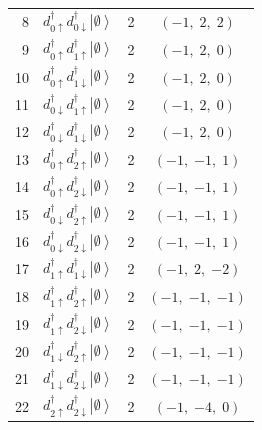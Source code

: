 \documentclass[11pt,a4paper]{article}
\newcommand{\ua}{\uparrow}
\newcommand{\da}{\downarrow}
\newcommand{\ket}[1]{\left|#1\right\rangle}
\newcommand{\empt}{\ket{\emptyset}}
\newcommand{\ddag}{d^{\dagger}}
\begin{document}
{\begin{longtable}{rp{8.6cm}cc}
 8 & $\ddag_{0\ua}\ddag_{0\da}\empt$
   & 2 & $(-1,\;2,\;2)$ \\
 9 & $\ddag_{0\ua}\ddag_{1\ua}\empt$
   & 2 & $(-1,\;2,\;0)$ \\
10 & $\ddag_{0\ua}\ddag_{1\da}\empt$
   & 2 & $(-1,\;2,\;0)$ \\
11 & $\ddag_{0\da}\ddag_{1\ua}\empt$
   & 2 & $(-1,\;2,\;0)$ \\
12 & $\ddag_{0\da}\ddag_{1\da}\empt$
   & 2 & $(-1,\;2,\;0)$ \\
13 & $\ddag_{0\ua}\ddag_{2\ua}\empt$
   & 2 & $(-1,\;{-1},\;1)$ \\
14 & $\ddag_{0\ua}\ddag_{2\da}\empt$
   & 2 & $(-1,\;{-1},\;1)$ \\
15 & $\ddag_{0\da}\ddag_{2\ua}\empt$
   & 2 & $(-1,\;{-1},\;1)$ \\
16 & $\ddag_{0\da}\ddag_{2\da}\empt$
   & 2 & $(-1,\;{-1},\;1)$ \\
17 & $\ddag_{1\ua}\ddag_{1\da}\empt$
   & 2 & $(-1,\;2,\;{-2})$ \\
18 & $\ddag_{1\ua}\ddag_{2\ua}\empt$
   & 2 & $(-1,\;{-1},\;{-1})$ \\
19 & $\ddag_{1\ua}\ddag_{2\da}\empt$
   & 2 & $(-1,\;{-1},\;{-1})$ \\
20 & $\ddag_{1\da}\ddag_{2\ua}\empt$
   & 2 & $(-1,\;{-1},\;{-1})$ \\
21 & $\ddag_{1\da}\ddag_{2\da}\empt$
   & 2 & $(-1,\;{-1},\;{-1})$ \\
22 & $\ddag_{2\ua}\ddag_{2\da}\empt$
   & 2 & $(-1,\;{-4},\;0)$ \\[3pt]
\midrule


\end{longtable}}
\end{document}
